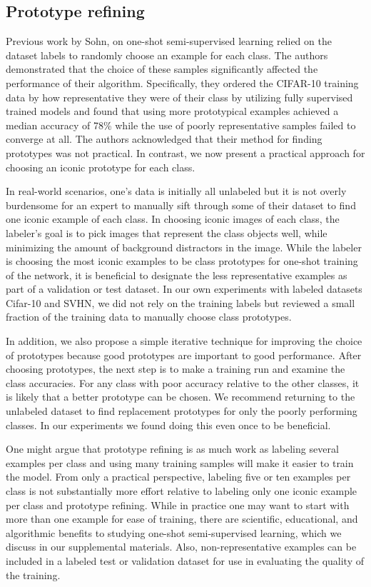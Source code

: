 \documentclass[final]{cvpr}
\newcommand{\OSSSL}{one-shot semi-supervised learning }
\newcommand{\OSSSLno}{one-shot semi-supervised learning}
\begin{document}
\subsection{Prototype refining}
\label{sec:refining}

Previous work by Sohn, \etal \cite{sohn2020fixmatch} on \OSSSL relied on the dataset labels to randomly choose an example for each class.
The authors demonstrated that the choice of these samples significantly affected the performance of their algorithm.
Specifically, they ordered the CIFAR-10 training data by how representative they were of their class by utilizing fully supervised trained models and found that using more prototypical examples achieved a median accuracy of 78\% while the use of poorly representative samples failed to converge at all.
The authors acknowledged that their method for finding prototypes was not practical.
In contrast, we now present a practical approach for choosing an iconic prototype for each class.

In real-world scenarios, one's data is initially all unlabeled but it is not overly burdensome for an expert to manually sift through some of their dataset to find one iconic example of each class.
In choosing iconic images of each class, the labeler's goal is to pick images that represent the class objects well, while minimizing the amount of background distractors in the image.
While the labeler is choosing the most iconic examples to be class prototypes for one-shot training of the network, it is beneficial to designate the less representative examples as part of a validation or test dataset.
In our own experiments with labeled datasets Cifar-10 and SVHN, we did not rely on the training labels but reviewed a small fraction of the training data to manually choose class prototypes.

In addition, we also propose a simple iterative technique for improving the choice of prototypes because good prototypes are important to good performance.
After choosing prototypes, the next step is to make a training run and examine the class accuracies.
For any class with poor accuracy relative to the other classes, it is likely that a better prototype can be chosen.  
We recommend returning to the unlabeled dataset to find replacement prototypes for only the poorly performing classes.
In our experiments we found doing this even once to be beneficial.


One might argue that prototype refining is as much work as labeling several examples per class and using many training samples will make it easier to train the model.
From only a practical perspective, labeling five or ten examples per class is not substantially more effort relative to labeling only one iconic example per class and prototype refining.
While in practice one may want to start with more than one example for ease of training, there are scientific, educational, and algorithmic benefits to studying \OSSSLno, which we discuss in our supplemental materials.
Also, non-representative examples can be included in a labeled test or validation dataset for use in evaluating the quality of the training.
\end{document}
